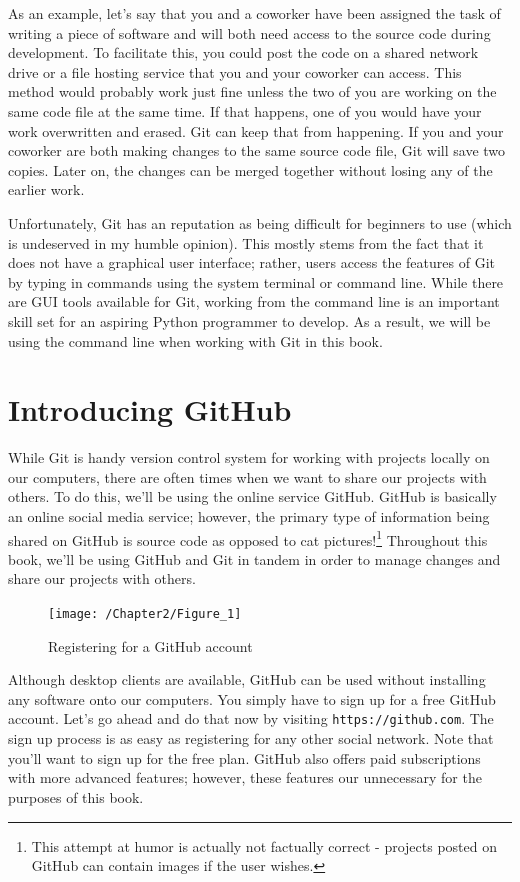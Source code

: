 \documentclass{book}
\begin{document}
As an example, let's say that you and a coworker have been assigned the task of writing a piece of software and will both need access to the source code during development. To facilitate this, you could post the code on a shared network drive or a file hosting service that you and your coworker can access. This method would probably work just fine unless the two of you are working on the same code file at the same time. If that happens, one of you would have your work overwritten and erased. Git can keep that from happening. If you and your coworker are both making changes to the same source code file, Git will save two copies. Later on, the changes can be merged together without losing any of the earlier work. 

Unfortunately, Git has an reputation as being difficult for beginners to use (which is undeserved in my humble opinion). This mostly stems from the fact that it does not have a graphical user interface; rather, users access the features of Git by typing in commands using the system terminal or command line. While there are GUI tools available for Git, working from the command line is an important skill set for an aspiring Python programmer to develop. As a result, we will be using the command line when working with Git in this book. 

\section{Introducing GitHub}

While Git is handy version control system for working with projects locally on our computers, there are often times when we want to share our projects with others. To do this, we'll be using the online service GitHub\texttrademark. GitHub is basically an online social media service; however, the primary type of information being shared on GitHub is source code as opposed to cat pictures!\footnote{This attempt at humor is actually not factually correct - projects posted on GitHub can contain images if the user wishes.} Throughout this book, we'll be using GitHub and Git in tandem in order to manage changes and share our projects with others.

\begin{figure}[h]
	\caption{Registering for a GitHub account}
	\centering\texttt{[image: /Chapter2/Figure\_1]}
\end{figure}

Although desktop clients are available, GitHub can be used without installing any software onto our computers. You simply have to sign up for a free GitHub account. Let's go ahead and do that now by visiting \texttt{https://github.com}. The sign up process is as easy as registering for any other social network. Note that you'll want to sign up for the free plan. GitHub also offers paid subscriptions with more advanced features; however, these features our unnecessary for the purposes of this book.
\end{document}
